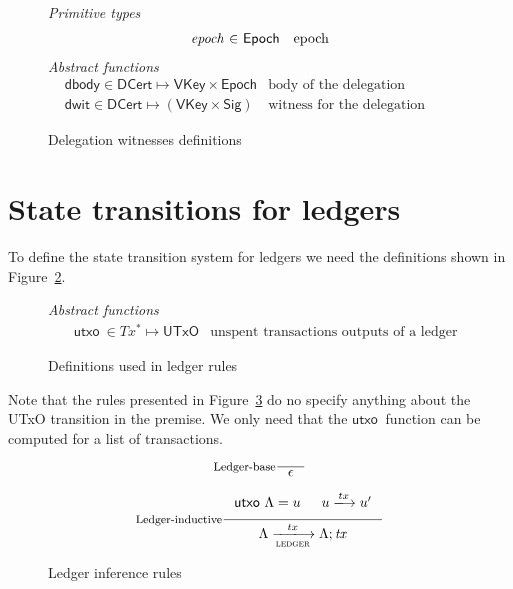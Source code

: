 \documentclass[11pt,a4paper]{article}
\newcommand{\var}[1]{\mathit{#1}}
\newcommand{\fun}[1]{\mathsf{#1}}
\newcommand{\type}[1]{\mathsf{#1}}
\newcommand{\trans}[2]{\xlongrightarrow[\textsc{#1}]{#2}}
\newcommand{\seqof}[1]{#1^{*}}
\newcommand{\UTxO}{\type{UTxO}}
\newcommand{\VKey}{\type{VKey}}
\newcommand{\Sig}{\type{Sig}}
\newcommand{\DCert}{\type{DCert}}
\newcommand{\Epoch}{\type{Epoch}}
\newcommand{\utxo}[1]{\fun{utxo}~ #1}
\begin{document}
\begin{figure}
  \emph{Primitive types}
  \begin{equation*}
    \begin{array}{r@{~\in~}lr}
      \var{epoch} & \Epoch & \text{epoch}
    \end{array}
  \end{equation*}
    \emph{Abstract functions}
  \begin{align*}
      & \fun{dbody} \in \DCert \mapsto \VKey \times \Epoch & \text{body of the delegation certificate}\\
      & \fun{dwit} \in \DCert \mapsto (\VKey \times \Sig) & \text{witness for the delegation certificate}
  \end{align*}
  \caption{Delegation witnesses definitions}
  \label{fig:delegation-witnesses-defs}
\end{figure}

\section{State transitions for ledgers}
\label{sec:state-trans-ledg}

To define the state transition system for ledgers we need the definitions
shown in Figure~\ref{fig:ledger-rules-defs}.

\begin{figure}
  \emph{Abstract functions}
  \begin{align*}
    & \utxo{} \in \seqof{Tx} \mapsto \UTxO
      & \text{unspent transactions outputs of a ledger}
  \end{align*}
  \caption{Definitions used in ledger rules}
  \label{fig:ledger-rules-defs}
\end{figure}

Note that the rules presented in Figure~\ref{fig:ledger-rules} do no specify
anything about the UTxO transition in the premise. We only need that the
$\utxo{}$ function can be computed for a list of transactions.

\begin{figure}
  \begin{equation}
    \label{eq:ledger-base}
    \inference[Ledger-base]
    {}
    {\epsilon}
  \end{equation}

  \begin{equation}
    \label{eq:ledger-indutive}
    \inference[Ledger-inductive]
    {\utxo{\Lambda} = u & u \trans{}{tx} u' }
    {\Lambda \trans{ledger}{tx}{\Lambda; \var{tx}}}
  \end{equation}
  \caption{Ledger inference rules}
  \label{fig:ledger-rules}
\end{figure}
\end{document}
